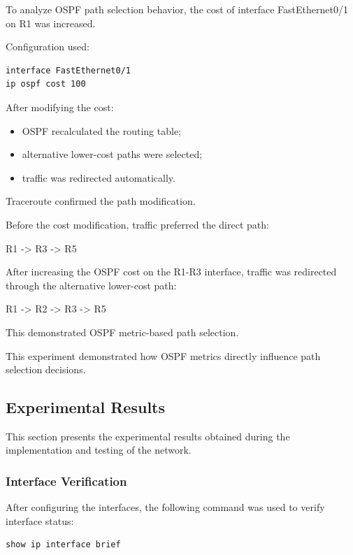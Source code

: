 \documentclass[12pt]{article}
\begin{document}
To analyze OSPF path selection behavior, the cost of interface FastEthernet0/1 on R1 was increased.

Configuration used:

\begin{lstlisting}
interface FastEthernet0/1
ip ospf cost 100
\end{lstlisting}

After modifying the cost:
\begin{itemize}
    \item OSPF recalculated the routing table;
    \item alternative lower-cost paths were selected;
    \item traffic was redirected automatically.
\end{itemize}

Traceroute confirmed the path modification.

Before the cost modification, traffic preferred the direct path:

R1 -> R3 -> R5

After increasing the OSPF cost on the R1-R3 interface, traffic was redirected through the alternative lower-cost path:

R1 -> R2 -> R3 -> R5

This demonstrated OSPF metric-based path selection.

This experiment demonstrated how OSPF metrics directly influence path selection decisions.

\subsection{Experimental Results}

This section presents the experimental results obtained during the implementation and testing of the network.

\subsubsection{Interface Verification}

After configuring the interfaces, the following command was used to verify interface status:

\begin{lstlisting}
show ip interface brief
\end{lstlisting}
\end{document}
